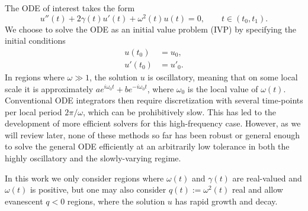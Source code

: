 \documentclass[10pt]{article}
\newcommand{\be}{\begin{equation}}
\newcommand{\ee}{\end{equation}}
\newcommand{\ba}{\begin{align}}
\newcommand{\ea}{\end{align}}
\newcommand{\om}{\omega}
\newcommand{\g}{\gamma}
\begin{document}
The ODE of interest takes the form
\be
u''(t) + 2\g(t) u'(t) + \om^2(t)u(t) = 0, \qquad t \in (t_0,t_1).
\label{ode}
\ee
We choose to solve the ODE as an initial value problem (IVP) by specifying the initial conditions
\begin{align} %
    u(t_0) &= u_0, \label{ic0} \\
    u'(t_0) &= u'_0. \label{ic1}
\end{align}
In regions where $\om \gg 1$, the solution $u$ is oscillatory, meaning that on some local
scale it is approximately $a e^{i\om_0t} + b e^{-i\om_0t}$, where $\om_0$ is the local value of $\om(t)$.
Conventional ODE integrators then require discretization with several
time-points per local period $2\pi/\om$, which can be prohibitively slow.
This has led to the development of more efficient solvers for this
high-frequency case. However, as we will review later, none of these methods so
far has been robust or general enough to solve the general ODE efficiently at an arbitrarily
low tolerance in both the highly oscillatory and the slowly-varying regime.   

In this work we only consider regions where $\om(t)$ and $\g(t)$ are real-valued and $\om(t)$ is positive, but 
one may also consider $q(t):=\om^2(t)$ real and allow evanescent
$q<0$ regions, where the solution $u$ has rapid growth and decay.
\end{document}
